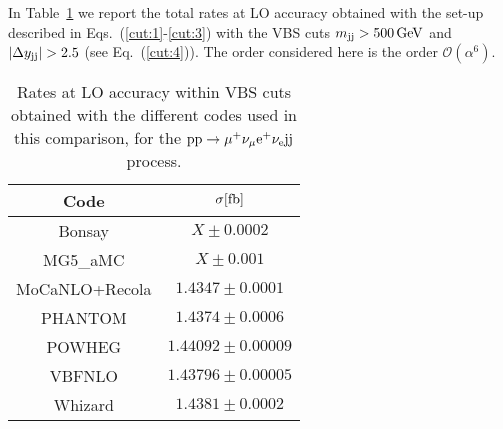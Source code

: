 In Table~\ref{tab:wg1_LOrates} we report the total rates at LO accuracy obtained with the set-up described in Eqs.~(\ref{cut:1}-\ref{cut:3}) with the VBS cuts $m_{\text{j}\text{j}} > 500 \,\text{GeV}$ and $|\Delta y_{\text{j}\text{j}}| > 2.5$ (see Eq.~(\ref{cut:4})).
The order considered here is the order $\mathcal{O}(\alpha^6)$.

\begin{table}[h!]
    \centering
    \begin{tabular}{c|c}
        Code  &  $\sigma[\rm{fb}]$  \\
        \hline
        \hline
        {\sc Bonsay}  &  $X \pm 0.0002$ \\
        {\sc MG5\_aMC}&  $X \pm 0.001$  \\
        {\sc MoCaNLO+Recola}  &  $1.4347 \pm 0.0001$ \\
        {\sc PHANTOM} &  $1.4374 \pm 0.0006 $  \\
        {\sc POWHEG}  &  $1.44092 \pm 0.00009$ \\
        {\sc VBFNLO}  &  $1.43796 \pm 0.00005$ \\
        {\sc Whizard} &  $1.4381 \pm 0.0002 $
    \end{tabular}
    \caption{\label{tab:wg1_LOrates} Rates at LO accuracy within VBS cuts obtained with the different codes used in this comparison,
    for the ${\rm p}{\rm p}\to\mu^+\nu_\mu{\rm e}^+\nu_{\rm e}{\rm j}{\rm j}$ process.}
\end{table}
